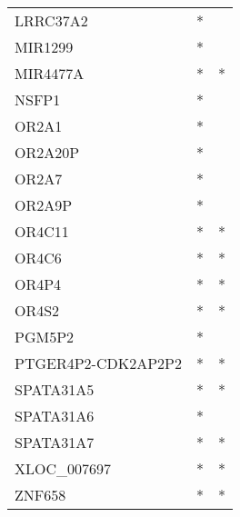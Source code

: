 \begin{longtable}{lcc}
LRRC37A2           &         * &         \\
MIR1299            &         * &         \\
MIR4477A           &         * &       * \\
NSFP1              &         * &         \\
OR2A1              &         * &         \\
OR2A20P            &         * &         \\
OR2A7              &         * &         \\
OR2A9P             &         * &         \\
OR4C11             &         * &       * \\
OR4C6              &         * &       * \\
OR4P4              &         * &       * \\
OR4S2              &         * &       * \\
PGM5P2             &         * &         \\
PTGER4P2-CDK2AP2P2 &         * &       * \\
SPATA31A5          &         * &       * \\
SPATA31A6          &         * &         \\
SPATA31A7          &         * &       * \\
XLOC\_007697        &         * &       * \\
ZNF658             &         * &       * \\
\end{longtable}
